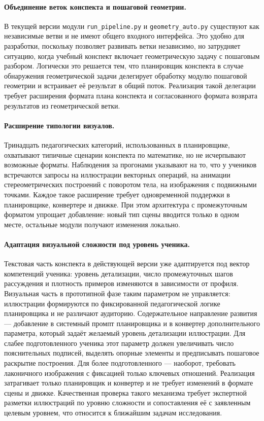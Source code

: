 \paragraph{Объединение веток конспекта и пошаговой геометрии.} В текущей версии модули \texttt{run\_pipeline.py} и \texttt{geometry\_auto.py} существуют как независимые ветви и не имеют общего входного интерфейса. Это удобно для разработки, поскольку позволяет развивать ветки независимо, но затрудняет ситуацию, когда учебный конспект включает геометрическую задачу с пошаговым разбором. Логически это решается тем, что планировщик конспекта в случае обнаружения геометрической задачи делегирует обработку модулю пошаговой геометрии и встраивает её результат в общий поток. Реализация такой делегации требует расширения формата плана конспекта и согласованного формата возврата результатов из геометрической ветки.

\paragraph{Расширение типологии визуалов.} Тринадцать педагогических категорий, использованных в планировщике, охватывают типичные сценарии конспекта по математике, но не исчерпывают возможные форматы. Наблюдения за прогонами указывают на то, что у учеников встречаются запросы на иллюстрации векторных операций, на анимации стереометрических построений с поворотом тела, на изображения с подвижными точками. Каждое такое расширение требует одновременной поддержки в планировщике, конвертере и движке. При этом архитектура с промежуточным форматом упрощает добавление: новый тип сцены вводится только в одном месте, остальные модули получают изменения локально.

\paragraph{Адаптация визуальной сложности под уровень ученика.} Текстовая часть конспекта в действующей версии уже адаптируется под вектор компетенций ученика: уровень детализации, число промежуточных шагов рассуждения и плотность примеров изменяются в зависимости от профиля. Визуальная часть в прототипной фазе таким параметром не управляется: иллюстрации формируются по фиксированной педагогической логике планировщика и не различают аудиторию. Содержательное направление развития --- добавление в системный промпт планировщика и в конвертер дополнительного параметра, который задаёт желаемый уровень детализации иллюстрации. Для слабее подготовленного ученика этот параметр должен увеличивать число пояснительных подписей, выделять опорные элементы и предписывать пошаговое раскрытие построения. Для более подготовленного --- наоборот, требовать лаконичного изображения с фиксацией только ключевых отношений. Реализация затрагивает только планировщик и конвертер и не требует изменений в формате сцены и движке. Качественная проверка такого механизма требует экспертной разметки иллюстраций по уровню сложности и сопоставления её с заявленным целевым уровнем, что относится к ближайшим задачам исследования.

